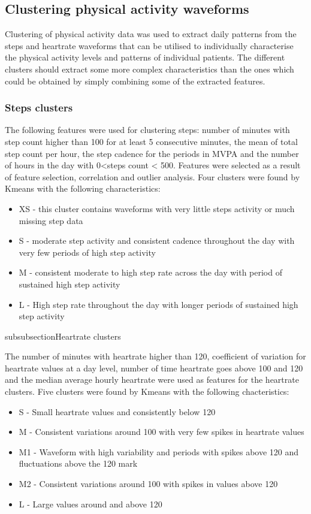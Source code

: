 \documentclass{article}
\begin{document}
\subsection{Clustering physical activity waveforms} 

Clustering of physical activity data was used to extract daily patterns from the steps and heartrate waveforms that can be utilised to individually characterise the physical activity levels and patterns of individual patients. The different clusters should extract some more complex characteristics than the ones which could be obtained by simply combining some of the extracted features. 

\subsubsection{Steps clusters}

The following features were used for clustering steps: number of minutes with step count higher than 100 for at least 5 consecutive minutes, the mean of total step count per hour, the step cadence for the periods in MVPA and the number of hours in the day with 0<steps count < 500. Features were selected as a result of feature selection, correlation and outlier analysis. Four clusters were found by Kmeans with the following characteristics: 

\begin{itemize}
\item XS - this cluster contains waveforms with very little steps activity or much missing step data 
\item S - moderate step activity and consistent cadence throughout the day with very few periods of high step activity 
\item M - consistent moderate to high step rate across the day with period of sustained high step activity  
\item L - High step rate throughout the day with longer periods of sustained high step activity
\end{itemize}

subsubsection{Heartrate clusters}

The number of minutes with heartrate higher than 120, coefficient of variation for heartrate values at a day level, number of time heartrate goes above 100 and 120 and the median average hourly heartrate were used as features for the heartrate clusters. Five clusters were found by Kmeans with the following chacteristics: 
\begin{itemize}
\item S - Small heartrate values and consistently below 120 
\item M - Consistent variations around 100 with very few spikes in heartrate values 
\item M1 - Waveform with high variability and periods with spikes above 120 and fluctuations above the 120 mark 
\item M2 - Consistent variations around 100 with spikes in values above 120 
\item L - Large values around and above 120 
\end{itemize}
\end{document}
